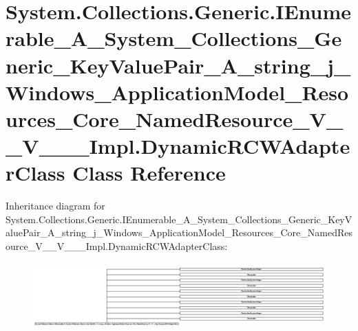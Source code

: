 \hypertarget{class_system_1_1_collections_1_1_generic_1_1_i_enumerable___a___system___collections___generic__55240078e6af9f5cefea1351a7216ee5}{}\section{System.\+Collections.\+Generic.\+I\+Enumerable\+\_\+\+A\+\_\+\+System\+\_\+\+Collections\+\_\+\+Generic\+\_\+\+Key\+Value\+Pair\+\_\+\+A\+\_\+string\+\_\+j\+\_\+\+Windows\+\_\+\+Application\+Model\+\_\+\+Resources\+\_\+\+Core\+\_\+\+Named\+Resource\+\_\+\+V\+\_\+\+\_\+\+V\+\_\+\+\_\+\+\_\+\+Impl.\+Dynamic\+R\+C\+W\+Adapter\+Class Class Reference}
\label{class_system_1_1_collections_1_1_generic_1_1_i_enumerable___a___system___collections___generic__55240078e6af9f5cefea1351a7216ee5}
Inheritance diagram for System.\+Collections.\+Generic.\+I\+Enumerable\+\_\+\+A\+\_\+\+System\+\_\+\+Collections\+\_\+\+Generic\+\_\+\+Key\+Value\+Pair\+\_\+\+A\+\_\+string\+\_\+j\+\_\+\+Windows\+\_\+\+Application\+Model\+\_\+\+Resources\+\_\+\+Core\+\_\+\+Named\+Resource\+\_\+\+V\+\_\+\+\_\+\+V\+\_\+\+\_\+\+\_\+\+Impl.\+Dynamic\+R\+C\+W\+Adapter\+Class\+:\begin{figure}[H]
\begin{center}
\leavevmode
\includegraphics[height=2.599156cm]{class_system_1_1_collections_1_1_generic_1_1_i_enumerable___a___system___collections___generic__55240078e6af9f5cefea1351a7216ee5}
\end{center}
\end{figure}
